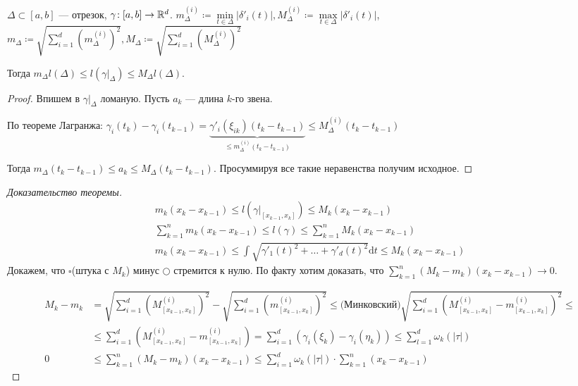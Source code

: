 \begin{lemma}
    $\Delta \subset [a, b]$ --- отрезок, $\gamma\!: [a, b] \to \mathbb{R}^d$.  $m_\Delta^{(i)} \coloneqq \min\limits_{t \in \Delta}|\delta'_i(t)|, M_\Delta^{(i)} \coloneqq \max\limits_{t \in \Delta}|\delta'_i(t)|$, $m_\Delta \coloneqq \sqrt{\sum\limits_{i=1}^d (m_\Delta^{(i)})^2}, M_\Delta \coloneqq \sqrt{\sum\limits_{i=1}^d (M_\Delta^{(i)})^2}$

    Тогда $m_\Delta l(\Delta) \le l(\gamma \Big|_\Delta) \le M_\Delta l(\Delta)$.
\end{lemma}
\begin{proof}
    Впишем в $\gamma \Big|_\Delta$ ломаную. Пусть  $a_k$ --- длина  $k$-го звена.

    По теореме Лагранжа:  $\gamma_i(t_k) - \gamma_i(t_{k-1}) = \underbrace{\gamma'_i(\xi_{ik})(t_k - t_{k-1})}_{\le m_\Delta^{(i)}(t_k - t_{k-1})} \le M_\Delta^{(i)} (t_k - t_{k-1})$

    Тогда $m_\Delta (t_k - t_{k-1}) \le a_k \le M_\Delta(t_k - t_{k-1})$. Просуммируя все такие неравенства получим исходное.
\end{proof}
\begin{proof}[Доказательство теоремы]
   \begin{align*}
       m_k(x_k - x_{k-1}) \le l(\gamma \Big|_{[x_{k-1}, x_k]}) \le M_k(x_k - x_{k-1}) \\
       \sum_{k=1}^n m_k (x_k - x_{k-1}) \le l(\gamma) \le \sum_{k=1}^n M_k(x_k - x_{k-1}) \\
       m_k(x_k - x_{k-1}) \le \int\limits \sqrt{\gamma'_1(t)^2 + \ldots + \gamma'_d(t)^2}\mathrm{d}t \le M_k(x_{k} - x_{k-1})
   \end{align*}
   Докажем, что $\square$(штука с $M_k$) минус $\bigcirc$ стремится к нулю. По факту хотим доказать, что $\sum\limits_{k=1}^n (M_k - m_k)(x_k - x_{k-1}) \to 0$. 

    \begin{align*}
        M_k - m_k &= \sqrt{\sum_{i=1}^d (M_{[x_{k-1}, x_k]}^{(i)})^2} - \sqrt{\sum_{i=1}^d (m_{[x_{k-1}, x_k]}^{(i)})^2}  \le\text{(Минковский)} \sqrt{\sum_{i=1}^d (M_{[x_{k-1}, x_k]}^{(i)} - m_{[x_{k-1}, x_k]}^{(i)})^2} \le \\ 
                  &\le \sum_{i=1}^d (M_{[x_{k-1}, x_k]}^{(i)} - m_{[x_{k-1}, x_k]}^{(i)}) = \sum_{i=1}^d (\gamma_i(\xi_k) - \gamma_i(\eta_k)) \le \sum_{l=1}^d \omega_k(|\tau|)\\
        0 &\le \sum_{k=1}^n (M_k - m_k)(x_k - x_{k-1}) \le \sum_{i=1}^d \omega_k(|\tau|) \cdot \sum_{k=1}^n (x_k - x_{k-1})
   \end{align*}
\end{proof}
